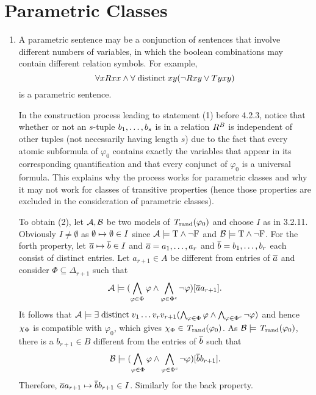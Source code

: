 \section{Parametric Classes}
\begin{enumerate}[1.]
%
\item {} A parametric sentence may be a conjunction of sentences that involve different numbers of variables, in which the boolean combinations may contain different relation symbols. For example,
\[
\forall x Rxx \land \forall \mathrel{\mathrm{distinct}} x y (\neg Rxy \lor Tyxy)
\]
is a parametric sentence.

In the construction process leading to statement (1) before 4.2.3, notice that whether or not an $s$-tuple $b_1, \ldots, b_s$ is in a relation $R^{B}$ is independent of other tuples (not necessarily having length $s$) due to the fact that every atomic subformula of $\varphi_0$ contains exactly the variables that appear in its corresponding quantification and that every conjunct of $\varphi_0$ is a universal formula. This explains why the process works for parametric classes and why it may not work for classes of transitive properties (hence those properties are excluded in the consideration of parametric classes).

To obtain (2), let $\mathcal{A}, \mathcal{B}$ be two models of $\mathit{T}_{\mathrm{rand}}(\varphi_0)$ and choose $I$ as in 3.2.11. Obviously $I \neq \emptyset$ as $\emptyset \mapsto \emptyset \in I$ since $\mathcal{A} \models \mathrm{T} \land \neg\mathrm{F}$ and $\mathcal{B} \models \mathrm{T} \land \neg\mathrm{F}$. For the forth property, let $\overline{a} \mapsto \overline{b} \in I$ and $\overline{a} = a_1, \ldots, a_r$ and $\overline{b} = b_1, \ldots, b_r$ each consist of distinct entries. Let $a_{r + 1} \in A$ be different from entries of $\overline{a}$ and consider $\Phi \subseteq \Delta_{r + 1}$ such that
\[
\mathcal{A} \models (\bigwedge_{\varphi \in \Phi} \varphi \land \bigwedge_{\varphi \in \Phi^\mathit{c}} \neg\varphi)[\overline{a}a_{r + 1}].
\]
It follows that $\mathcal{A} \models \exists \mathrel{\mathrm{distinct}} v_1 \ldots v_rv_{r + 1} (\bigwedge_{\varphi \in \Phi} \varphi \land \bigwedge_{\varphi \in \Phi^\mathit{c}} \neg\varphi)$ and hence $\extaxm[\Phi]$ is compatible with $\varphi_0$, which gives $\extaxm[\Phi] \in \randstrtheory(\varphi_0)$. As $\mathcal{B} \models \mathit{T}_{\mathrm{rand}}(\varphi_0)$, there is a $b_{r + 1} \in B$ different from the entries of $\overline{b}$ such that
\[
\mathcal{B} \models (\bigwedge_{\varphi \in \Phi} \varphi \land \bigwedge_{\varphi \in \Phi^\mathit{c}} \neg\varphi)[\overline{b}b_{r + 1}].
\]
Therefore, $\overline{a}a_{r + 1} \mapsto \overline{b}b_{r + 1} \in I$. Similarly for the back property.


\end{enumerate}
